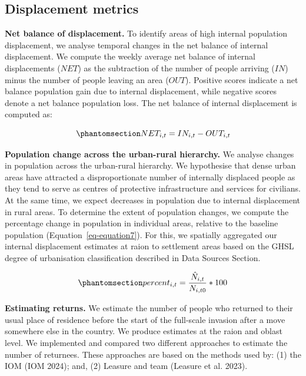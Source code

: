 \documentclass[
  sn-nature,
  11pt,
]{sn-jnl}
\begin{document}
\subsection{Displacement metrics}\label{sec-metrics}

\textbf{Net balance of displacement.} To identify areas of high internal
population displacement, we analyse temporal changes in the net balance
of internal displacement. We compute the weekly average net balance of
internal displacements (\(NET\)) as the subtraction of the number of
people arriving (\(IN\)) minus the number of people leaving an area
(\(OUT\)). Positive scores indicate a net balance population gain due to
internal displacement, while negative scores denote a net balance
population loss. The net balance of internal displacement is computed
as:

\begin{equation}\phantomsection\label{eq-equation6}{ NET_{i,t} = {IN_{i,t}} - {OUT_{i,t}} }\end{equation}

\textbf{Population change across the urban-rural hierarchy.} We analyse
changes in population across the urban-rural hierarchy. We hypothesise
that dense urban areas have attracted a disproportionate number of
internally displaced people as they tend to serve as centres of
protective infrastructure and services for civilians. At the same time,
we expect decreases in population due to internal displacement in rural
areas. To determine the extent of population changes, we compute the
percentage change in population in individual areas, relative to the
baseline population (Equation~\ref{eq-equation7}). For this, we
spatially aggregated our internal displacement estimates at raion to
settlement areas based on the GHSL degree of urbanisation classification
described in Data Sources Section.

\begin{equation}\phantomsection\label{eq-equation7}{ percent_{i,t} = \frac {\hat{N}_{i,t}} {N_{i,t0}} * 100 }\end{equation}

\textbf{Estimating returns.} We estimate the number of people who
returned to their usual place of residence before the start of the
full-scale invasion after a move somewhere else in the country. We
produce estimates at the raion and oblast level. We implemented and
compared two different approaches to estimate the number of returnees.
These approaches are based on the methods used by: (1) the IOM (IOM
2024); and, (2) Leasure and team (Leasure et al. 2023).
\end{document}
